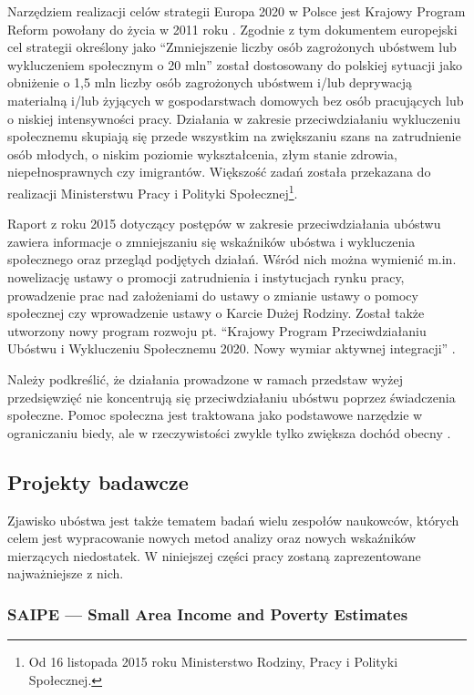Narzędziem realizacji celów strategii Europa 2020 w Polsce jest Krajowy Program Reform powołany do życia w 2011 roku \citep{mr2011}. Zgodnie z tym dokumentem europejski cel strategii określony jako ``Zmniejszenie liczby osób zagrożonych ubóstwem lub wykluczeniem społecznym o 20 mln'' został dostosowany do polskiej sytuacji jako obniżenie o 1,5 mln liczby osób zagrożonych ubóstwem i/lub deprywacją materialną i/lub żyjących w gospodarstwach domowych bez osób pracujących lub o niskiej intensywności pracy. Działania w zakresie przeciwdziałaniu wykluczeniu społecznemu skupiają się przede wszystkim na zwiększaniu szans na zatrudnienie osób młodych, o niskim poziomie wykształcenia, złym stanie zdrowia, niepełnosprawnych czy imigrantów. Większość zadań została przekazana do realizacji Ministerstwu Pracy i Polityki Społecznej\footnote{Od 16 listopada 2015 roku Ministerstwo Rodziny, Pracy i Polityki Społecznej.}.

Raport z roku 2015 dotyczący postępów w zakresie przeciwdziałania ubóstwu zawiera informacje o zmniejszaniu się wskaźników ubóstwa i wykluczenia społecznego oraz przegląd podjętych działań. Wśród nich można wymienić m.in. nowelizację ustawy o promocji zatrudnienia i instytucjach rynku pracy, prowadzenie prac nad założeniami do ustawy o zmianie ustawy o pomocy społecznej czy wprowadzenie ustawy o Karcie Dużej Rodziny. Został także utworzony nowy program rozwoju pt. ``Krajowy Program Przeciwdziałaniu Ubóstwu i Wykluczeniu Społecznemu 2020. Nowy wymiar aktywnej integracji'' \citep{mr2015}.

Należy podkreślić, że działania prowadzone w ramach przedstaw wyżej przedsięwzięć nie koncentrują się przeciwdziałaniu ubóstwu poprzez świadczenia społeczne. Pomoc społeczna jest traktowana jako podstawowe narzędzie w ograniczaniu biedy, ale w rzeczywistości zwykle tylko zwiększa dochód obecny \citep{barr2016}. 

\subsection{Projekty badawcze}

Zjawisko ubóstwa jest także tematem badań wielu zespołów naukowców, których celem jest wypracowanie nowych metod analizy oraz nowych wskaźników mierzących niedostatek. W niniejszej części pracy zostaną zaprezentowane najważniejsze z nich.

\subsubsection*{SAIPE --- Small Area Income and Poverty Estimates}

